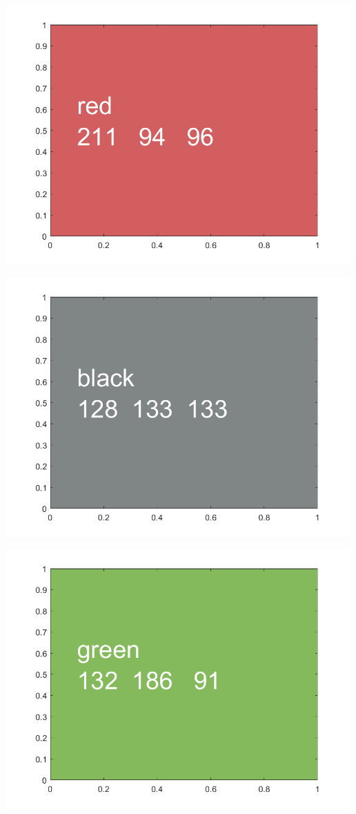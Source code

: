 \documentclass[
]{book}
\begin{document}
\includegraphics[width=5.20833in,height=\textheight]{img/fs_color_images/figure_7.png}

\includegraphics[width=5.20833in,height=\textheight]{img/fs_color_images/figure_8.png}

\includegraphics[width=5.20833in,height=\textheight]{img/fs_color_images/figure_9.png}
\end{document}
